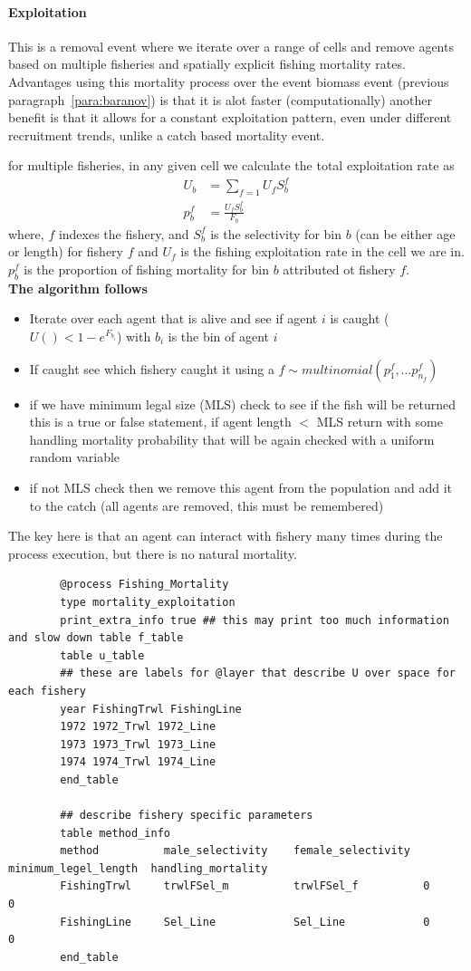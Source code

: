 \paragraph{Exploitation}\label{para:event_mort_exploitation}
This is a removal event where we iterate over a range of cells and remove agents based on multiple fisheries and spatially explicit fishing mortality rates. Advantages using this mortality process over the event biomass event (previous paragraph~\ref{para:baranov}) is that it is alot faster (computationally) another benefit is that it allows for a constant exploitation pattern, even under different recruitment trends, unlike a catch based mortality event.

for multiple fisheries, in any given cell we calculate the total exploitation rate as
\begin{align}
U_b &= \sum_{f = 1} U_fS^f_b\\
p^f_b &= \frac{U_fS^f_b}{F_b}
\end{align}
where, \(f\) indexes the fishery, and \(S^f_b\) is the selectivity for bin \(b\) (can be either age or length) for fishery \(f\) and \(U_f\) is the fishing exploitation rate in the cell we are in. \(p^f_b\) is the proportion of fishing mortality for bin \(b\) attributed ot fishery \(f\).\\
\textbf{The algorithm follows}
\begin{itemize}
	\item Iterate over each agent that is alive and see if agent \(i\) is caught ($U() < 1 - e^{F_{b_i}}$) with \(b_i\) is the bin of agent \(i\)
	\item If caught see which fishery caught it using a \(f \sim multinomial(p^f_1, \dots p^f_{n_f})\)
	\item if we have minimum legal size (MLS) check to see if the fish will be returned this is a true or false statement, if agent length $<$ MLS return with some handling mortality probability that will be again checked with a uniform random variable
	\item if not MLS check then we remove this agent from the population and add it to the catch (all agents are removed, this must be remembered)
\end{itemize}
The key here is that an agent can interact with fishery many times during the process execution, but there is no natural mortality.

\pagebreak
{\small{\begin{verbatim}
		@process Fishing_Mortality
		type mortality_exploitation
		print_extra_info true ## this may print too much information and slow down table f_table
		table u_table
		## these are labels for @layer that describe U over space for each fishery
		year FishingTrwl FishingLine
		1972 1972_Trwl 1972_Line
		1973 1973_Trwl 1973_Line
		1974 1974_Trwl 1974_Line
		end_table
		
		## describe fishery specific parameters		
		table method_info
		method          male_selectivity    female_selectivity 	minimum_legel_length  handling_mortality
		FishingTrwl     trwlFSel_m          trwlFSel_f			0			0
		FishingLine	    Sel_Line            Sel_Line			0			0
		end_table
		\end{verbatim}}}

